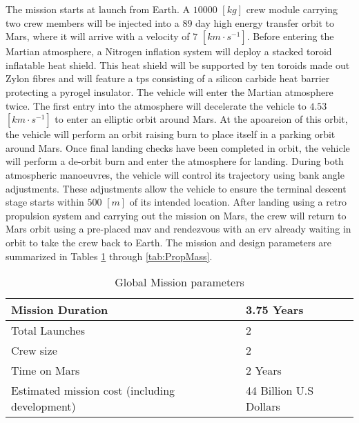 The mission starts at launch from Earth. A $10 000$ $[kg]$ crew module carrying two crew members will be injected into a $89$ day high energy transfer orbit to Mars, where it will arrive with a velocity of $7$ $[km\cdot s^{-1}]$. Before entering the Martian atmosphere, a Nitrogen inflation system will deploy a stacked toroid inflatable heat shield. This heat shield will be supported by ten toroids made out Zylon fibres and will feature a \gls{tps} consisting of a silicon carbide heat barrier protecting a pyrogel insulator. The vehicle will enter the Martian atmosphere twice. The first entry into the atmosphere will decelerate the vehicle to $4.53$ $[km\cdot s^{-1}]$ to enter an elliptic orbit around Mars. At the apoareion of this orbit, the vehicle will perform an orbit raising burn to place itself in a parking orbit around Mars. Once final landing checks have been completed in orbit, the vehicle will perform a de-orbit burn and enter the atmosphere for landing. During both atmospheric manoeuvres, the vehicle will control its trajectory using bank angle adjustments. These adjustments allow the vehicle to ensure the terminal descent stage starts within $500$ $[m]$ of its intended location. After landing using a retro propulsion system and carrying out the mission on Mars, the crew will return to Mars orbit using a pre-placed \gls{mav} and rendezvous with an \gls{erv} already waiting in orbit to take the crew back to Earth. The mission and design parameters are summarized in Tables \ref{tab:MissionPar} through \ref{tab:PropMass}.


\begin{table}
	\centering
	\caption{Global Mission parameters}
	\label{tab:MissionPar}
	\begin{tabular}{|l|l|} \hline
		Mission Duration				             	& 	3.75 Years						\\ \hline 
		Total Launches       							&	2  		   	  					\\ \hline
		Crew size				 						&	2     	  						\\ \hline
		Time on Mars				              	   	&  	2 Years    						\\ \hline
		Estimated mission cost (including development) 	&  	44 Billion U.S Dollars			\\ \hline
	\end{tabular}
\end{table}

